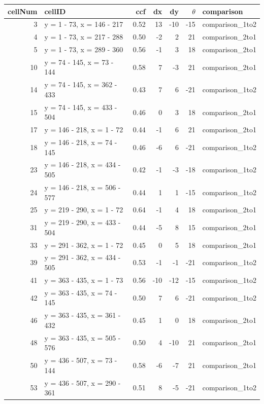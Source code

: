 \begin{table}[htbp]
    \centering
    \begin{tabular}{|r|l|r|r|r|r|l|}
\hline
cellNum & cellID & ccf & dx & dy & $\theta$ & comparison\\
\hline
3 & y = 1 - 73, x = 146 - 217 & 0.52 & 13 & -10 & -15 & comparison\_1to2\\
\hline
4 & y = 1 - 73, x = 217 - 288 & 0.50 & -2 & 2 & 21 & comparison\_2to1\\
\hline
5 & y = 1 - 73, x = 289 - 360 & 0.56 & -1 & 3 & 18 & comparison\_2to1\\
\hline
10 & y = 74 - 145, x = 73 - 144 & 0.58 & 7 & -3 & 21 & comparison\_2to1\\
\hline
14 & y = 74 - 145, x = 362 - 433 & 0.43 & 7 & 6 & -21 & comparison\_1to2\\
\hline
15 & y = 74 - 145, x = 433 - 504 & 0.46 & 0 & 3 & 18 & comparison\_2to1\\
\hline
17 & y = 146 - 218, x = 1 - 72 & 0.44 & -1 & 6 & 21 & comparison\_2to1\\
\hline
18 & y = 146 - 218, x = 74 - 145 & 0.46 & -6 & 6 & -21 & comparison\_1to2\\
\hline
23 & y = 146 - 218, x = 434 - 505 & 0.42 & -1 & -3 & -18 & comparison\_1to2\\
\hline
24 & y = 146 - 218, x = 506 - 577 & 0.44 & 1 & 1 & -15 & comparison\_1to2\\
\hline
25 & y = 219 - 290, x = 1 - 72 & 0.64 & -1 & 4 & 18 & comparison\_2to1\\
\hline
31 & y = 219 - 290, x = 433 - 504 & 0.44 & -5 & 8 & 15 & comparison\_2to1\\
\hline
33 & y = 291 - 362, x = 1 - 72 & 0.45 & 0 & 5 & 18 & comparison\_2to1\\
\hline
39 & y = 291 - 362, x = 434 - 505 & 0.53 & -1 & -1 & -21 & comparison\_1to2\\
\hline
41 & y = 363 - 435, x = 1 - 73 & 0.56 & -10 & -12 & -15 & comparison\_1to2\\
\hline
42 & y = 363 - 435, x = 74 - 145 & 0.50 & 7 & 6 & -21 & comparison\_1to2\\
\hline
46 & y = 363 - 435, x = 361 - 432 & 0.45 & 1 & 0 & 18 & comparison\_2to1\\
\hline
48 & y = 363 - 435, x = 505 - 576 & 0.50 & 4 & -10 & 21 & comparison\_2to1\\
\hline
50 & y = 436 - 507, x = 73 - 144 & 0.58 & -6 & -7 & 21 & comparison\_2to1\\
\hline
53 & y = 436 - 507, x = 290 - 361 & 0.51 & 8 & -5 & -21 & comparison\_1to2\\

\end{tabular}
\end{table}
